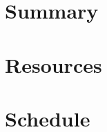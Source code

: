 \documentclass[a4paper,10pt]{article}
\begin{document}
\section{Summary}


\section{Resources}


\section{Schedule}

\end{document}
